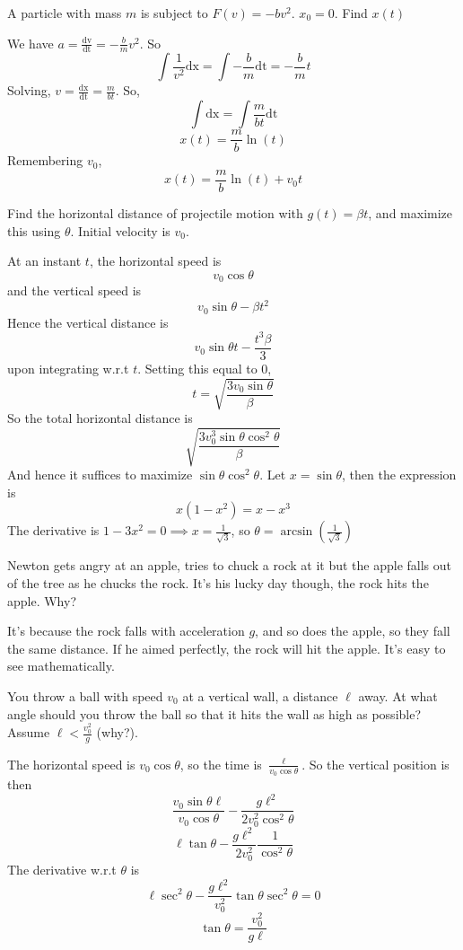 \documentclass[11pt]{scrartcl}
\newcommand{\ca}[1]{\mathrm{#1}}
\begin{document}
\begin{example}
  [3.37]
  A particle with mass $m$ is subject to $F(v)=-bv^2$. $x_0=0$. Find $x(t)$
\end{example}
\begin{soln}
  We have $a=\frac{\ca{dv}}{\ca{dt}}=-\frac{b}{m}v^2$.
  So
  $$\int \frac{1}{v^2}\ca{dx}=\int -\frac{b}{m}\ca{dt}=-\frac{b}{m}t$$
  Solving, $v=\frac{\ca{dx}}{\ca{dt}}=\frac{m}{bt}$. So,
  $$\int \ca{dx}=\int \frac{m}{bt}\ca{dt}$$
  $$x(t)=\frac{m}{b}\ln(t)$$
  Remembering $v_0$,
  $$x(t)=\frac{m}{b}\ln(t)+v_0t$$
\end{soln}
\begin{example}
  [3.43]
  Find the horizontal distance of projectile motion with $g(t)=\beta t$, and maximize this using $\theta$. Initial velocity is $v_0$.
\end{example}
\begin{soln}
  At an instant $t$, the horizontal speed is $$v_0\cos\theta$$ and the
  vertical speed is $$v_0\sin\theta-\beta t^2$$
  Hence the vertical distance is
  $$v_0\sin\theta t-\frac{t^3\beta}{3}$$
  upon integrating w.r.t $t$. Setting this equal to $0$,
  $$t=\sqrt{\frac{3v_0\sin\theta}{\beta}}$$
  So the total horizontal distance is
  $$\sqrt{\frac{3v_0^3\sin\theta\cos^2\theta}{\beta}}$$
  And hence it suffices to maximize $\sin\theta\cos^2\theta$.
  Let $x=\sin\theta$, then the expression is
  $$x(1-x^2)=x-x^3$$
  The derivative is $1-3x^2=0\implies x=\frac{1}{\sqrt{3}}$, so
  $\theta=\arcsin\left(\frac{1}{\sqrt{3}}\right)$
\end{soln}
\begin{example}
  [3.44]
  Newton gets angry at an apple, tries to chuck a rock at it but the apple falls out of the tree as he chucks the rock.
  It's his lucky day though, the rock hits the apple. Why?
\end{example}
\begin{soln}
  It's because the rock falls with acceleration $g$,
  and so does the apple, so they fall the same distance. If he aimed perfectly,
  the rock will hit the apple. It's easy to see mathematically.
\end{soln}
\begin{example}
  [3.47]
  You throw a ball with speed $v_0$ at a vertical wall, a distance $\ell$ away. At what angle should you throw the ball so that it hits the wall as high as
  possible? Assume $\ell<\frac{v_0^2}{g}$ (why?).
\end{example}
\begin{soln}
  The horizontal speed is $v_0\cos\theta$, so the time is $\frac{\ell}{v_0\cos\theta}$. So the vertical position is then
  $$\frac{v_0\sin\theta\ell}{v_0\cos\theta}-\frac{g\ell^2}{2v_0^2\cos^2\theta}$$
  $$\ell\tan\theta-\frac{g\ell^2}{2v_0^2} \frac{1}{\cos^2\theta}$$
  The derivative w.r.t $\theta$ is
  $$\ell\sec^2\theta-\frac{g\ell^2}{v_0^2}\tan\theta\sec^2\theta=0$$
  $$\tan\theta=\frac{v_0^2}{g\ell}$$
\end{soln}
\end{document}
